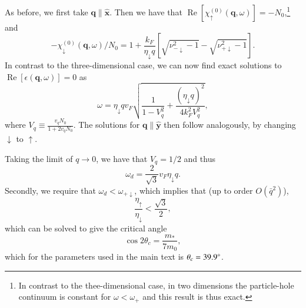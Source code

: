 \documentclass[aps,prb,reprint,twocolumns,superscriptaddress,nofootinbib]{revtex4-2}
\DeclareMathOperator{\Ree}{Re}
\newcommand{\xx}{\hat{\bm{x}}}
\newcommand{\yy}{\hat{\bm{y}}}
\newcommand{\mdos}{\tilde{m}}
\newcommand{\kF}{k_{F}}
\begin{document}
	As before, we first take $\bm q\parallel\xx$. Then we have that $\Ree[\chi_{\uparrow}^{(0)}(\bm q,\omega)]=-N_0$,\footnote{In contrast to the thee-dimensional case, in two dimensions the particle-hole continuum is constant for $\omega<\omega_{+}$ and this result is thus exact.}  and 
	\begin{equation}
		-\chi_\downarrow^{(0)} (\bm q,\omega) / N_0 = 1 + \frac{\kF}{\eta_\downarrow q} \left[\sqrt{\nu_{-\downarrow}^2-1}-\sqrt{\nu_{+\downarrow}^2-1}\right].
	\end{equation} 
	In contrast to the three-dimensional case, we can now find exact solutions to $\Ree[\epsilon(\bm q,\omega)]=0$ as \cite{agarwalLonglivedSpinPlasmons2014}
	\begin{equation}
		\omega = \eta_{\downarrow} qv_F \sqrt{\frac{1}{1-V_q^2} + \frac{(\eta_\downarrow q)^2}{4\kF^2V_q^2}},
	\end{equation}
	where $V_q \equiv \frac{v_qN_0}{1+2v_qN_0}$.
	The solutions for $\bm q\parallel \yy $ then follow analogously, by changing $\downarrow$ to $\uparrow$. 
	
	Taking the limit of $q\rightarrow0$, we have that $V_q=1/2$ and thus
	\begin{equation}
		\omega_d=\frac{2}{\sqrt{3}} v_F \eta_\downarrow q. \label{eq:ws-2D}
	\end{equation}
	Secondly, we require that $\omega_{d}<\omega_{+\downarrow}$, which implies that (up to order $O(\bar q^2)$),
	\begin{equation}
		\frac{\eta_{\uparrow}}{\eta_{\downarrow}} < \frac{\sqrt{3}}{2}, \label{eq:stability-2D}
	\end{equation}
	which can be solved to give the critical angle
	\begin{equation}
		\cos2\theta_c =  \frac{m_*}{7m_0},
	\end{equation}
	which for the parameters used in the main text is $\theta_c=\SI{39.9}{\degree}$.
	
\end{document}
